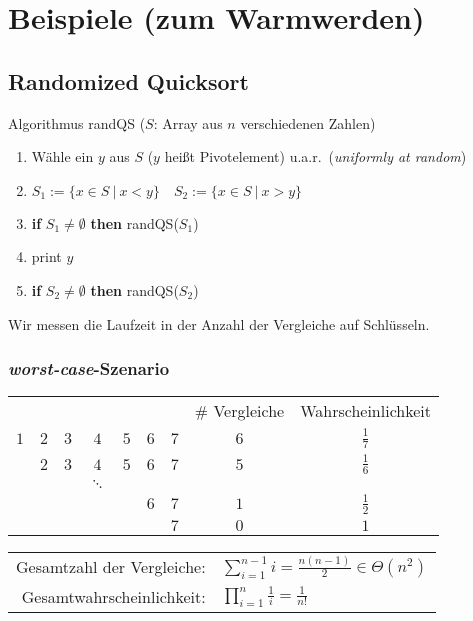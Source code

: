 \section{Beispiele (\glqq zum Warmwerden\grqq)}
\subsection{Randomized Quicksort}
\begin{algorithm}
	\caption{Algorithmus randQS ($S$: Array aus $n$ verschiedenen Zahlen)}
	\vspace{0.4cm}
	\begin{enumerate}
		\setlength{\itemsep}{2pt}
		\setlength{\parskip}{2pt}
		\setlength{\parsep}{2pt}
		\item Wähle ein $y$ aus $S$ ($y$ heißt Pivotelement) u.a.r.\ (\textit{uniformly at random})
		\item $S_1 := \{ x \in S\ |\ x < y \} \quad S_2 := \{ x \in S\ |\ x > y \}$
		\item \textbf{if} $S_1 \not= \emptyset$ \textbf{then} randQS($S_1$)
		\item print $y$
		\item \textbf{if} $S_2 \not= \emptyset$ \textbf{then} randQS($S_2$)
	\end{enumerate}
\end{algorithm}
Wir messen die Laufzeit in der Anzahl der Vergleiche auf Schlüsseln.
\subsubsection{\textit{worst-case}-Szenario}
\begin{center}
\renewcommand\arraystretch{1.3}
\begin{tabular}{ccccccc|c|c}
	&&&&&&& \# Vergleiche & Wahrscheinlichkeit \\
	$1$&$2$&$3$&$4$&$5$&$6$&$7$&$6$&$\frac{1}{7}$\\
	&$2$&$3$&$4$&$5$&$6$&$7$&$5$&$\frac{1}{6}$\\
	&&&$\ddots$&&&&&\\
	&&&&&$6$&$7$&$1$&$\frac{1}{2}$\\
	&&&&&&$7$&$0$&$1$
\end{tabular}
\renewcommand\arraystretch{2.5}
\begin{tabular}{rl}
	Gesamtzahl der Vergleiche: & $\displaystyle \sum_{i=1}^{n-1} i = \frac{n(n-1)}{2} \in \Theta(n^2)$ \\
	Gesamtwahrscheinlichkeit: & $\displaystyle \prod_{i=1}^{n} \frac{1}{i} = \frac{1}{n!}$
\end{tabular}
\end{center}
